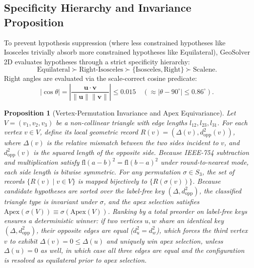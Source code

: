 \documentclass[preprint,12pt]{elsarticle}
\newtheorem{proposition}{Proposition}
\begin{document}
\subsection{Specificity Hierarchy and Invariance Proposition}
To prevent hypothesis suppression (where less constrained hypotheses like Isosceles trivially absorb more constrained hypotheses like Equilateral), GeoSolver 2D evaluates hypotheses through a strict specificity hierarchy:
\begin{equation}
\label{eq:hierarchy}
\text{Equilateral} \succ \text{Right-Isosceles} \succ \{\text{Isosceles}, \text{Right}\} \succ \text{Scalene}.
\end{equation}
Right angles are evaluated via the scale-correct cosine predicate:
\begin{equation}
\label{eq:cosine}
|\cos \theta| = \left| \frac{\mathbf{u} \cdot \mathbf{v}}{\|\mathbf{u}\| \|\mathbf{v}\|} \right| \le 0.015 \quad (\approx |\theta - 90^\circ| \le 0.86^\circ).
\end{equation}

\begin{proposition}[Vertex-Permutation Invariance and Apex Equivariance]
\label{prop:invariance}
Let $V = (v_1, v_2, v_3)$ be a non-collinear triangle with edge lengths $l_{12}, l_{23}, l_{31}$. For each vertex $v \in V$, define its local geometric record $R(v) = (\Delta(v), d^2_{\text{opp}}(v))$, where $\Delta(v)$ is the relative mismatch between the two sides incident to $v$, and $d^2_{\text{opp}}(v)$ is the squared length of the opposite side. Because IEEE-754 subtraction and multiplication satisfy $\text{fl}(a - b)^2 = \text{fl}(b - a)^2$ under round-to-nearest mode, each side length is bitwise symmetric. For any permutation $\sigma \in S_3$, the set of records $\{R(v) \mid v \in V\}$ is mapped bijectively to $\{R(\sigma(v))\}$. Because candidate hypotheses are sorted over the label-free key $(\Delta, d^2_{\text{opp}})$, the classified triangle type is invariant under $\sigma$, and the apex selection satisfies $\text{Apex}(\sigma(V)) \equiv \sigma(\text{Apex}(V))$. Ranking by a total preorder on label-free keys ensures a deterministic winner: if two vertices $u, w$ share an identical key $(\Delta, d^2_{\text{opp}})$, their opposite edges are equal ($d^2_u = d^2_w$), which forces the third vertex $v$ to exhibit $\Delta(v) = 0 \le \Delta(u)$ and uniquely win apex selection, unless $\Delta(u) = 0$ as well, in which case all three edges are equal and the configuration is resolved as equilateral prior to apex selection.
\end{proposition}
\end{document}
